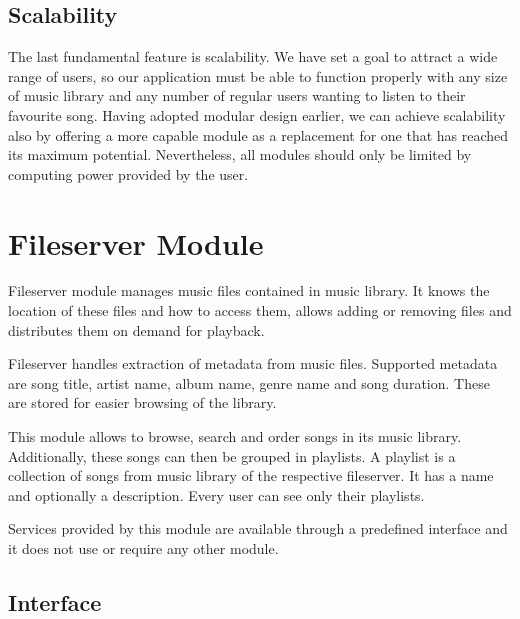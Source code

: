 \subsection{Scalability}

The last fundamental feature is scalability. We have set a goal to attract a wide range of users, so our application must be able to function properly with any size of music library and any number of regular users wanting to listen to their favourite song. Having adopted modular design earlier, we can achieve scalability also by offering a more capable module as a replacement for one that has reached its maximum potential. Nevertheless, all modules should only be limited by computing power provided by the user.

\section{Fileserver Module}

Fileserver module manages music files contained in music library. It knows the location of these files and how to access them, allows adding or removing files and distributes them on demand for playback.
\par
Fileserver handles extraction of metadata from music files. Supported metadata are song title, artist name, album name, genre name and song duration. These are stored for easier browsing of the library.
\par
This module allows to browse, search and order songs in its music library. Additionally, these songs can then be grouped in playlists. A playlist is a collection of songs from music library of the respective fileserver. It has a name and optionally a description. Every user can see only their playlists.
\par
Services provided by this module are available through a predefined interface and it does not use or require any other module.

\subsection{Interface}

